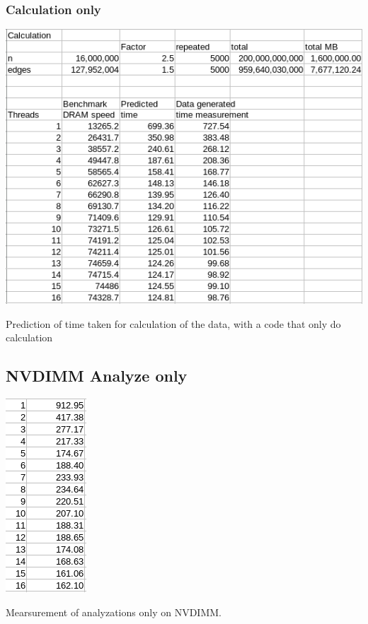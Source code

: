 \documentclass[12pt,a4paper,USenglish]{article}      %
\begin{document}
\subsubsection{Calculation only} 
\begin{table}[!hbtp]
\includegraphics[scale=0.7]{Benchmark_only_prediction.png}
\caption{Prediction of time taken for calculation of the data, with a code that only do calculation}
\end{table}

\clearpage
\subsection{NVDIMM Analyze only}
\begin{table}[!hbtp]
\includegraphics[scale=0.7]{NVDIMM_analyze_only}
\caption{Mearsurement of analyzations only on NVDIMM.}
\end{table}
\end{document}
